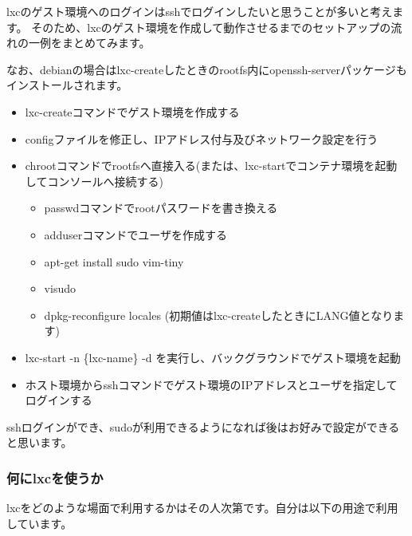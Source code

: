 \documentclass[mingoth,a4paper]{jsarticle}
\begin{document}
lxcのゲスト環境へのログインはsshでログインしたいと思うことが多いと考えます。
そのため、lxcのゲスト環境を作成して動作させるまでのセットアップの流れの一例をまとめてみます。

なお、debianの場合はlxc-createしたときのrootfs内にopenssh-serverパッケージもインストールされます。

\begin{itemize}
\item lxc-createコマンドでゲスト環境を作成する
\item configファイルを修正し、IPアドレス付与及びネットワーク設定を行う
\item chrootコマンドでrootfsへ直接入る(または、lxc-startでコンテナ環境を起動してコンソールへ接続する)
  \begin{itemize}
  \item passwdコマンドでrootパスワードを書き換える
  \item adduserコマンドでユーザを作成する
  \item apt-get install sudo vim-tiny
  \item visudo
  \item dpkg-reconfigure locales  (初期値はlxc-createしたときにLANG値となります)
  \end{itemize}
\item lxc-start -n \{lxc-name\} -d を実行し、バックグラウンドでゲスト環境を起動
\item ホスト環境からsshコマンドでゲスト環境のIPアドレスとユーザを指定してログインする
\end{itemize}

sshログインができ、sudoが利用できるようになれば後はお好みで設定ができると思います。

\newpage

\subsubsection{何にlxcを使うか}

lxcをどのような場面で利用するかはその人次第です。自分は以下の用途で利用しています。
\end{document}
